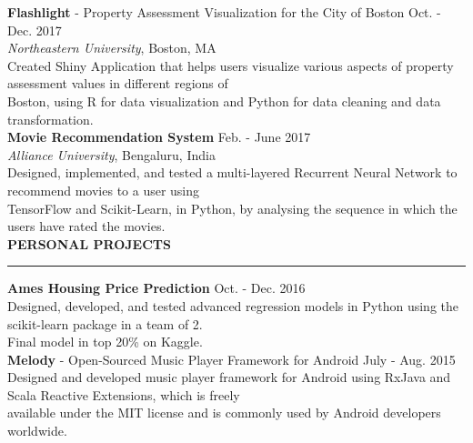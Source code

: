 \documentclass[a4paper]{article}
\newcommand{\myline}{\par
  \kern2pt %
  \hrule height 0.5pt
  \kern2pt %
}
\newcommand{\mybullet}{
	\indent \textbullet \hspace*{2mm}
}
\begin{document}
        \noindent
        \textbf{Flashlight} - Property Assessment Visualization for the City of Boston 
        \hfill Oct. - Dec. 2017 \\
        \textit{Northeastern University}, Boston, MA \\
        \mybullet Created Shiny Application that helps users visualize various aspects of 
        property assessment values in different regions of \\ \hspace*{9mm} Boston, using 
        R for data visualization and Python for data cleaning and data transformation. \\
        
        \noindent
        \textbf{Movie Recommendation System} \hfill Feb. - June 2017\\
        \textit{Alliance University}, Bengaluru, India \\
        \mybullet Designed, implemented, and tested a multi-layered Recurrent Neural Network 
        to recommend movies to a user using \\ \hspace*{9mm} TensorFlow and Scikit-Learn, 
        in Python, by analysing the sequence in which the users have rated the movies. \\ 

	\noindent
	{\large \textbf{PERSONAL PROJECTS}}
	\myline 
	\smallskip
	
	\noindent
	\textbf{Ames Housing Price Prediction} \hfill Oct. - Dec. 2016 \\
	\mybullet Designed, developed, and tested advanced regression models in Python using 
        the scikit-learn package in a team of 2. \\
	\mybullet Final model in top 20\% on Kaggle. \\
	
	\noindent
	\textbf{Melody} - Open-Sourced Music Player Framework for Android \hfill July - Aug. 2015\\
	\mybullet Designed and developed music player framework for Android using RxJava and 
        Scala Reactive Extensions, which is freely\\ \hspace*{9mm} available under the MIT license 
        and is commonly used by Android developers worldwide. \\
	
\end{document}
